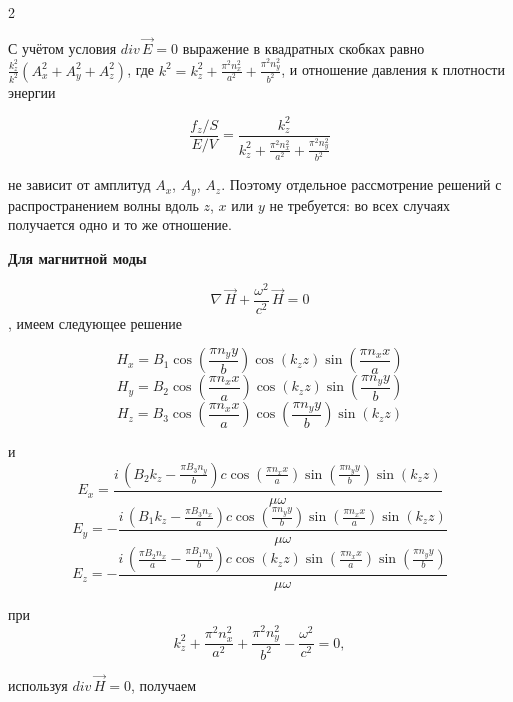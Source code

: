 \documentclass[twoside, 10pt]{article}
\begin{document}
\begin{multicols}{2}

С учётом условия \(div\,\vec{E}=0\) выражение в квадратных скобках равно
\(\frac{k_z^2}{k^2}\left(A_x^2+A_y^2+A_z^2\right)\), где \(k^2=k_z^2+\frac{\pi^2n_x^2}{a^2}+\frac{\pi^2n_y^2}{b^2}\),
и отношение давления к плотности энергии

\begin{equation}\frac{f_z/S}{E/V} = \frac{k_{z}^{2}}{k_{z}^{2} + \frac{\pi^{2} n_{x}^{2}}{a^{2}} + \frac{\pi^{2} n_{y}^{2}}{b^{2}}}\end{equation}

не зависит от амплитуд \(A_x\), \(A_y\), \(A_z\). Поэтому отдельное рассмотрение решений с
распространением волны вдоль \(z\), \(x\) или \(y\) не требуется: во всех случаях получается одно
и то же отношение.

\textbf{Для магнитной моды}

\begin{equation}\nabla\,\vec{H} + \frac{\omega^2}{c^2}\,\vec{H} = 0\end{equation}, имеем следующее решение

    \[H_{x} = B_{1} \cos\left(\frac{\pi n_{y} y}{b}\right) \cos\left(k_{z} z\right) \sin\left(\frac{\pi n_{x} x}{a}\right)\]
\[H_{y} = B_{2} \cos\left(\frac{\pi n_{x} x}{a}\right) \cos\left(k_{z} z\right) \sin\left(\frac{\pi n_{y} y}{b}\right)\]
\[H_{z} = B_{3} \cos\left(\frac{\pi n_{x} x}{a}\right) \cos\left(\frac{\pi n_{y} y}{b}\right) \sin\left(k_{z} z\right)\]

    и
\[E_{x} = \frac{i \, {\left(B_{2} k_{z} - \frac{\pi B_{3} n_{y}}{b}\right)} c \cos\left(\frac{\pi n_{x} x}{a}\right) \sin\left(\frac{\pi n_{y} y}{b}\right) \sin\left(k_{z} z\right)}{\mu \omega}\]
\[E_{y} = -\frac{i \, {\left(B_{1} k_{z} - \frac{\pi B_{3} n_{x}}{a}\right)} c \cos\left(\frac{\pi n_{y} y}{b}\right) \sin\left(\frac{\pi n_{x} x}{a}\right) \sin\left(k_{z} z\right)}{\mu \omega}\]
\[E_{z} = -\frac{i \, {\left(\frac{\pi B_{2} n_{x}}{a} - \frac{\pi B_{1} n_{y}}{b}\right)} c \cos\left(k_{z} z\right) \sin\left(\frac{\pi n_{x} x}{a}\right) \sin\left(\frac{\pi n_{y} y}{b}\right)}{\mu \omega}\]

    при
\begin{equation}k_{z}^{2} + \frac{\pi^{2} n_{x}^{2}}{a^{2}} + \frac{\pi^{2} n_{y}^{2}}{b^{2}} - \frac{\omega^{2}}{c^{2}} = 0,\end{equation}

    используя \(div\,\vec{H} = 0\), получаем


\end{multicols}
\end{document}
